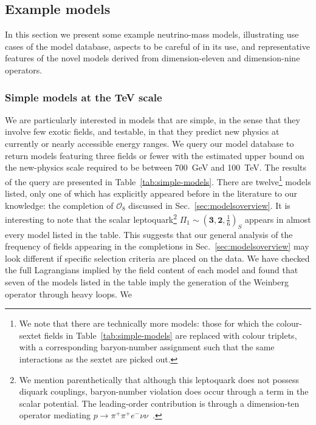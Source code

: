 \subsection{Example models}
\label{sec:example-models}

In this section we present some example neutrino-mass models, illustrating use
cases of the model database, aspects to be careful of in its use, and
representative features of the novel models derived from dimension-eleven and
dimension-nine operators.

\subsubsection{Simple models at the TeV scale}
\label{sec:simple-models}

We are particularly interested in models that are simple, in the sense that they
involve few exotic fields, and testable, in that they predict new physics at
currently or nearly accessible energy ranges. We query our model database to
return models featuring three fields or fewer with the estimated upper bound on
the new-physics scale required to be between \SI{700}{\GeV} and \SI{100}{\TeV}.
The results of the query are presented in Table~\ref{tab:simple-models}. There
are twelve\footnote{We note that there are technically more models: those for
  which the colour-sextet fields in Table~\ref{tab:simple-models} are replaced
  with colour triplets, with a corresponding baryon-number assignment such that
  the same interactions as the sextet are picked out.} models listed, only one
of which has explicitly appeared before in the literature to our knowledge: the
completion of $\mathcal{O}_{8}$ discussed in Sec.~\ref{sec:modelsoverview}. It
is interesting to note that the scalar leptoquark\footnote{We mention
  parenthetically that although this leptoquark does not possess diquark
  couplings, baryon-number violation does occur through a term in the scalar
  potential. The leading-order contribution is through a dimension-ten operator
  mediating $p \to \pi^{+}\pi^{+} e^{-} \nu \nu$~\cite{Arnold:2012sd}.}
$\Pi_{1} \sim (\mathbf{3}, \mathbf{2}, \tfrac{1}{6})_{S}$ appears in almost
every model listed in the table. This suggests that our general analysis of the
frequency of fields appearing in the completions in
Sec.~\ref{sec:modelsoverview} may look different if specific selection criteria
are placed on the data. We have checked the full Lagrangians implied by the
field content of each model and found that seven of the models listed in the
table imply the generation of the Weinberg operator through heavy loops. We
